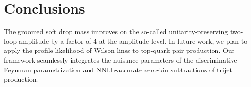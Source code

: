 \section{Conclusions}\label{sec:conclusions}

The groomed soft drop mass improves on the so-called
unitarity-preserving two-loop amplitude by a factor of 4 at the
amplitude level. In future work, we plan to apply the profile likelihood
of Wilson lines to top-quark pair production. Our framework seamlessly
integrates the nuisance parameters of the discriminative Feynman
parametrization and NNLL-accurate zero-bin subtractions of trijet
production.

